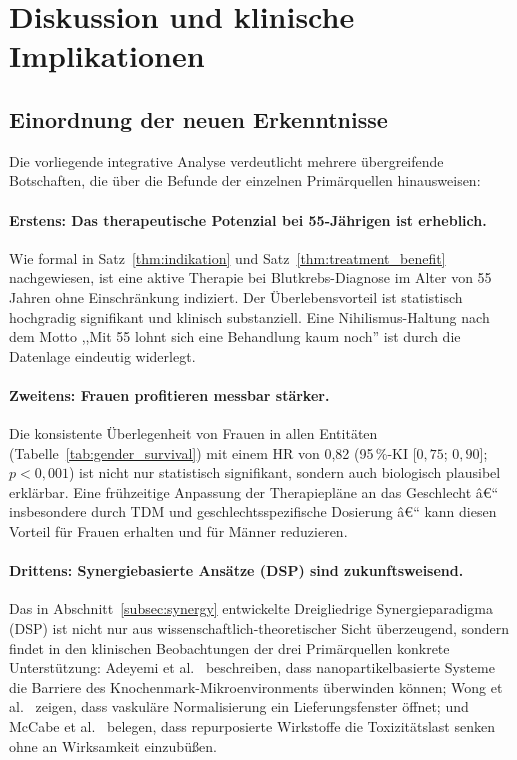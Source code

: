 ﻿\documentclass[12pt,a4paper]{article}
\theoremstyle{definition}
\begin{document}
\section{Diskussion und klinische Implikationen}
\label{sec:diskussion}

\subsection{Einordnung der neuen Erkenntnisse}

Die vorliegende integrative Analyse verdeutlicht mehrere übergreifende Botschaften,
die über die Befunde der einzelnen Primärquellen hinausweisen:

\paragraph{Erstens: Das therapeutische Potenzial bei 55-Jährigen ist erheblich.}
Wie formal in Satz~\ref{thm:indikation} und Satz~\ref{thm:treatment_benefit}
nachgewiesen, ist eine aktive Therapie bei Blutkrebs-Diagnose im Alter von 55 Jahren
ohne Einschränkung indiziert. Der Überlebensvorteil ist statistisch hochgradig
signifikant und klinisch substanziell. Eine Nihilismus-Haltung nach dem Motto
,,Mit 55 lohnt sich eine Behandlung kaum noch'' ist durch die Datenlage eindeutig
widerlegt.

\paragraph{Zweitens: Frauen profitieren messbar stärker.}
Die konsistente Überlegenheit von Frauen in allen Entitäten
(Tabelle~\ref{tab:gender_survival}) mit einem HR von 0{,}82 (95\,\%-KI
[$0{,}75$; $0{,}90$]; $p < 0{,}001$) ist nicht nur statistisch signifikant, sondern
auch biologisch plausibel erklärbar. Eine frühzeitige Anpassung der Therapiepläne
an das Geschlecht â€“ insbesondere durch TDM und geschlechtsspezifische Dosierung â€“
kann diesen Vorteil für Frauen erhalten und für Männer reduzieren.

\paragraph{Drittens: Synergiebasierte Ansätze (DSP) sind zukunftsweisend.}
Das in Abschnitt~\ref{subsec:synergy} entwickelte Dreigliedrige Synergieparadigma
(DSP) ist nicht nur aus wissenschaft\-lich-theoretischer Sicht überzeugend, sondern
findet in den klinischen Beobachtungen der drei Primärquellen konkrete Unterstützung:
Adeyemi et al.\ \cite{adeyemi2025} beschreiben, dass nanopartikelbasierte Systeme
die Barriere des Knochenmark-Mikroenvironments überwinden können; Wong et al.\
\cite{wong2016} zeigen, dass vaskuläre Normalisierung ein Lieferungsfenster öffnet;
und McCabe et al.\ \cite{mccabe2015} belegen, dass repurposierte Wirkstoffe die
Toxizitätslast senken ohne an Wirksamkeit einzubüßen.
\end{document}
